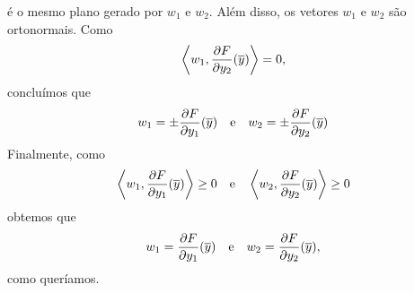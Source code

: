 \begin{demonstracao}
	é o mesmo plano gerado por $w_1$ e $w_2$. Al\'em disso, os vetores
	$w_1$ e $w_2$ s\~ao ortonormais. Como
	\begin{equation*}
	\left\langle w_1, \frac{\partial F}{\partial y_2}(\overline{y}) \right\rangle = 0,
	\end{equation*}
	conclu\'imos que
	\begin{equation*}
	w_1 = \pm \frac{\partial F}{\partial y_1}(\overline{y}) 
	\quad \text{e} \quad 
	w_2 = \pm \frac{\partial F}{\partial y_2}(\overline{y})
	\end{equation*}
	Finalmente, como
	\begin{equation*}
	\left\langle w_1, \frac{\partial F}{\partial y_1}(\overline{y}) \right\rangle \geq 0 
	\quad \text{e} \quad 
	\left\langle w_2, \frac{\partial F}{\partial y_2}(\overline{y}) \right\rangle \geq 0
	\end{equation*}	
	obtemos que
	\begin{equation*}
	w_1 = \frac{\partial F}{\partial y_1}(\overline{y}) \quad \text{e} \quad 
	w_2 = \frac{\partial F}{\partial y_2}(\overline{y}),
	\end{equation*}
	como quer\'iamos.
\end{demonstracao}







